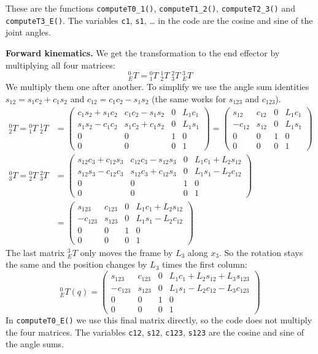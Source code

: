 \documentclass[11pt, a4paper]{article}
\begin{document}
These are the functions \texttt{computeT0\_1()}, \texttt{computeT1\_2()}, \texttt{computeT2\_3()} and
\texttt{computeT3\_E()}. The variables \texttt{c1}, \texttt{s1}, \ldots{} in the code are the cosine
and sine of the joint angles.

\textbf{Forward kinematics.} We get the transformation to the end effector by multiplying all four
matrices:
\[
  {}^0_ET = {}^0_1T \; {}^1_2T \; {}^2_3T \; {}^3_ET
\]
We multiply them one after another. To simplify we use the angle sum identities
$s_{12} = s_1 c_2 + c_1 s_2$ and $c_{12} = c_1 c_2 - s_1 s_2$ (the same works for $s_{123}$ and
$c_{123}$).
\begin{align*}
  {}^0_2T = {}^0_1T \; {}^1_2T &=
  \begin{pmatrix}
    c_1 s_2 + s_1 c_2 & c_1 c_2 - s_1 s_2 & 0 & L_1 c_1 \\
    s_1 s_2 - c_1 c_2 & s_1 c_2 + c_1 s_2 & 0 & L_1 s_1 \\
    0 & 0 & 1 & 0 \\ 0 & 0 & 0 & 1
  \end{pmatrix}
  =
  \begin{pmatrix}
    s_{12} & c_{12} & 0 & L_1 c_1 \\
    -c_{12} & s_{12} & 0 & L_1 s_1 \\
    0 & 0 & 1 & 0 \\ 0 & 0 & 0 & 1
  \end{pmatrix}
  \\[6pt]
  {}^0_3T = {}^0_2T \; {}^2_3T &=
  \begin{pmatrix}
    s_{12} c_3 + c_{12} s_3 & c_{12} c_3 - s_{12} s_3 & 0 & L_1 c_1 + L_2 s_{12} \\
    s_{12} s_3 - c_{12} c_3 & s_{12} c_3 + c_{12} s_3 & 0 & L_1 s_1 - L_2 c_{12} \\
    0 & 0 & 1 & 0 \\ 0 & 0 & 0 & 1
  \end{pmatrix}
  \\[6pt]
  &=
  \begin{pmatrix}
    s_{123} & c_{123} & 0 & L_1 c_1 + L_2 s_{12} \\
    -c_{123} & s_{123} & 0 & L_1 s_1 - L_2 c_{12} \\
    0 & 0 & 1 & 0 \\ 0 & 0 & 0 & 1
  \end{pmatrix}
\end{align*}
The last matrix ${}^3_ET$ only moves the frame by $L_3$ along $x_3$. So the rotation stays the same
and the position changes by $L_3$ times the first column:
\[
  \boxed{
  {}^0_ET(q) =
  \begin{pmatrix}
    s_{123} & c_{123} & 0 & L_1 c_1 + L_2 s_{12} + L_3 s_{123} \\
    -c_{123} & s_{123} & 0 & L_1 s_1 - L_2 c_{12} - L_3 c_{123} \\
    0 & 0 & 1 & 0 \\
    0 & 0 & 0 & 1
  \end{pmatrix}}
\]
In \texttt{computeT0\_E()} we use this final matrix directly, so the code does not multiply the four
matrices. The variables \texttt{c12}, \texttt{s12}, \texttt{c123}, \texttt{s123} are the cosine and
sine of the angle sums.
\end{document}
